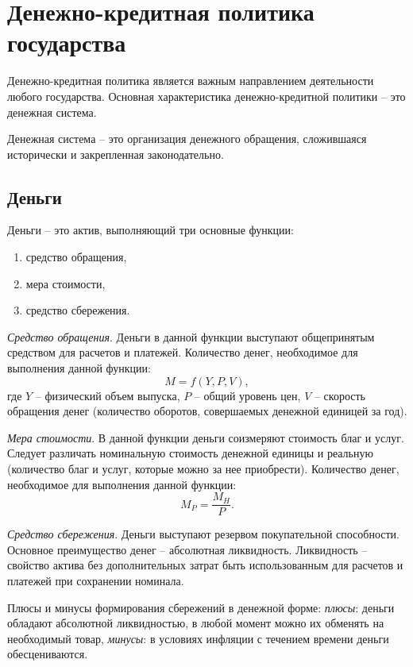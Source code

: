 \section{Денежно-кредитная политика государства}

Денежно-кредитная политика является важным направлением деятельности любого
государства. Основная характеристика денежно-кредитной политики -- это
денежная система.

Денежная система -- это организация денежного обращения, сложившаяся
исторически и закрепленная законодательно.

\subsection{Деньги}
Деньги -- это актив, выполняющий три основные функции:
\begin{enumerate}
    \item средство обращения,
    \item мера стоимости,
    \item средство сбережения.
\end{enumerate}

\emph{Средство обращения}. Деньги в данной функции выступают общепринятым
средством для расчетов и платежей. Количество денег, необходимое для выполнения
данной функции:
\[
    M = f(Y, P, V),
\]
где \( Y \) -- физический объем выпуска, \( P \) -- общий уровень цен, \( V \) -- скорость обращения
денег (количество оборотов, совершаемых денежной единицей за год).

\emph{Мера стоимости}. В данной функции деньги соизмеряют стоимость благ и
услуг. Следует различать номинальную стоимость денежной единицы и реальную
(количество благ и услуг, которые можно за нее приобрести). Количество денег,
необходимое для выполнения данной функции:
\[
    M_P = \frac{M_H}{P}.
\]

\emph{Средство сбережения}. Деньги выступают резервом покупательной
способности. Основное преимущество денег -- абсолютная ликвидность. Ликвидность
-- свойство актива без дополнительных затрат быть использованным для расчетов и
платежей при сохранении номинала.

Плюсы и минусы формирования сбережений в денежной форме:
\hspace*{2em}\emph{плюсы}: деньги обладают абсолютной ликвидностью, в любой
момент можно их обменять на необходимый товар,
\hspace*{2em}\emph{минусы}: в условиях инфляции с течением времени деньги
обесцениваются.

